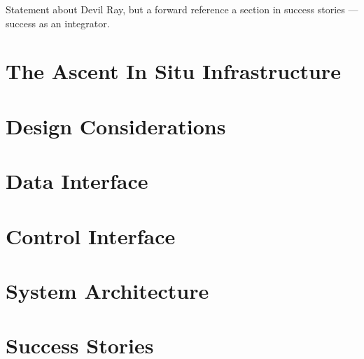 Statement about Devil Ray, but a forward reference a section in success stories --- success as an integrator.
\fi


\section{The Ascent In Situ Infrastructure}
\label{ascent_overview}


\section{Design Considerations}
\label{ascent_design_considerations}



\section{Data Interface}
\label{ascent_data}


\section{Control Interface}
\label{ascent_control}


\section{System Architecture}
\label{ascent_architecture}


\section{Success Stories}
\label{ascent_success}

